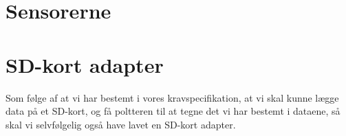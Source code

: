 \section{Sensorerne}



\section{SD-kort adapter}
Som følge af at vi har bestemt i vores kravspecifikation, at vi skal kunne lægge data på et
SD-kort, og få poltteren til at tegne det vi har bestemt i dataene, så
skal vi selvfølgelig også have lavet en SD-kort adapter.

